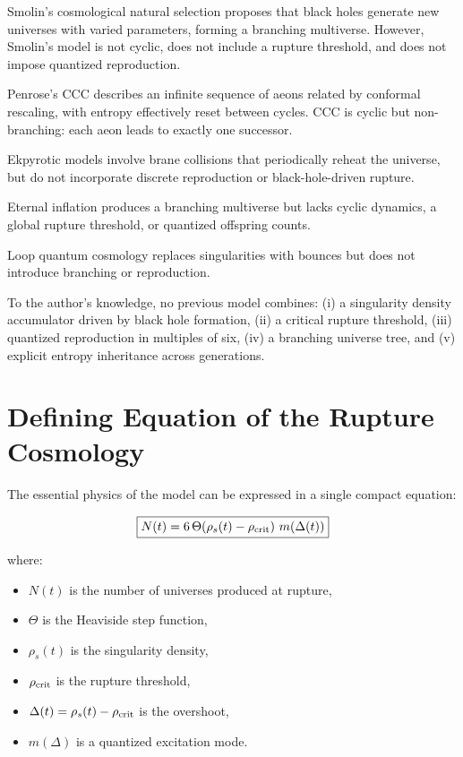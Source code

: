 \documentclass[12pt]{article}
\begin{document}
Smolin's cosmological natural selection \cite{Smolin1992,Smolin1997} proposes that black holes generate new universes with varied parameters, forming a branching multiverse. However, Smolin's model is not cyclic, does not include a rupture threshold, and does not impose quantized reproduction.

Penrose's CCC \cite{Penrose2010} describes an infinite sequence of aeons related by conformal rescaling, with entropy effectively reset between cycles. CCC is cyclic but non-branching: each aeon leads to exactly one successor.

Ekpyrotic models \cite{SteinhardtTurok2002,SteinhardtTurok2005} involve brane collisions that periodically reheat the universe, but do not incorporate discrete reproduction or black-hole-driven rupture.

Eternal inflation \cite{Guth2007} produces a branching multiverse but lacks cyclic dynamics, a global rupture threshold, or quantized offspring counts.

Loop quantum cosmology \cite{Ashtekar2006} replaces singularities with bounces but does not introduce branching or reproduction.

To the author's knowledge, no previous model combines: (i) a singularity density accumulator driven by black hole formation, (ii) a critical rupture threshold, (iii) quantized reproduction in multiples of six, (iv) a branching universe tree, and (v) explicit entropy inheritance across generations.

\section{Defining Equation of the Rupture Cosmology}

The essential physics of the model can be expressed in a single compact equation:

\begin{equation}
\boxed{
N(t) = 6\,\Theta\!\left(\rho_s(t) - \rho_{\rm crit}\right)\,
m\!\left(\Delta(t)\right)
}
\label{eq:master}
\end{equation}

where:
\begin{itemize}
\item $N(t)$ is the number of universes produced at rupture,
\item $\Theta$ is the Heaviside step function,
\item $\rho_s(t)$ is the singularity density,
\item $\rho_{\rm crit}$ is the rupture threshold,
\item $\Delta(t) = \rho_s(t) - \rho_{\rm crit}$ is the overshoot,
\item $m(\Delta)$ is a quantized excitation mode.
\end{itemize}
\end{document}
